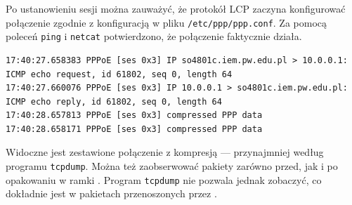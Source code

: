 Po ustanowieniu sesji można zauważyć, że protokół LCP zaczyna konfigurować
połączenie \tcp{} zgodnie z konfiguracją w pliku \texttt{/etc/ppp/ppp.conf}.
Za pomocą poleceń \texttt{ping} i \texttt{netcat} potwierdzono, że połączenie
faktycznie działa.

\begin{lstlisting}
17:40:27.658383 PPPoE [ses 0x3] IP so4801c.iem.pw.edu.pl > 10.0.0.1: ICMP echo request, id 61802, seq 0, length 64
17:40:27.660076 PPPoE [ses 0x3] IP 10.0.0.1 > so4801c.iem.pw.edu.pl: ICMP echo reply, id 61802, seq 0, length 64
17:40:28.657813 PPPoE [ses 0x3] compressed PPP data
17:40:28.658171 PPPoE [ses 0x3] compressed PPP data
\end{lstlisting}

Widoczne jest zestawione połączenie z kompresją --- przynajmniej według
programu \texttt{tcpdump}. Można też zaobserwować pakiety zarówno przed, jak i
po opakowaniu w ramki \ppp{}. Program \texttt{tcpdump} nie pozwala jednak
zobaczyć, co dokładnie jest w pakietach przenoszonych przez \ppp.
